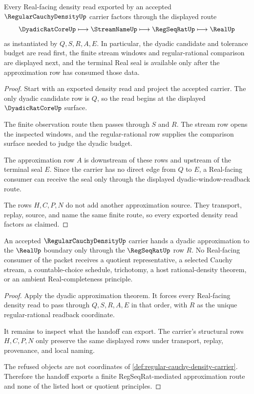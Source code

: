 \begin{theorem}
\label{thm:regular-cauchy-density-dyadic-approximation}
Every Real-facing density read exported by an accepted
$\RegularCauchyDensityUp$ carrier factors through the displayed route
$$
\DyadicRatCoreUp \longmapsto \StreamNameUp \longmapsto \RegSeqRatUp
\longmapsto \RealUp
$$
as instantiated by $Q,S,R,A,E$. In particular, the dyadic candidate and
tolerance budget are read first, the finite stream windows and
regular-rational comparison are displayed next, and the terminal Real seal is
available only after the approximation row has consumed those data.
\end{theorem}
\begin{proof}
Start with an exported density read and project the accepted carrier. The
only dyadic candidate row is $Q$, so the read begins at the displayed
$\DyadicRatCoreUp$ surface.

The finite observation route then passes through $S$ and $R$. The stream row
opens the inspected windows, and the regular-rational row supplies the
comparison surface needed to judge the dyadic budget.

The approximation row $A$ is downstream of these rows and upstream of the
terminal seal $E$. Since the carrier has no direct edge from $Q$ to $E$, a
Real-facing consumer can receive the seal only through the displayed
dyadic-window-readback route.

The rows $H,C,P,N$ do not add another approximation source. They transport,
replay, source, and name the same finite route, so every exported density read
factors as claimed.
\end{proof}

\begin{theorem}
\label{thm:regular-cauchy-density-regseqrat-handoff}
An accepted $\RegularCauchyDensityUp$ carrier hands a dyadic approximation to
the $\RealUp$ boundary only through the $\RegSeqRatUp$ row $R$. No Real-facing
consumer of the packet receives a quotient representative, a selected Cauchy
stream, a countable-choice schedule, trichotomy, a host rational-density
theorem, or an ambient Real-completeness principle.
\end{theorem}
\begin{proof}
Apply the dyadic approximation theorem. It forces every Real-facing density
read to pass through $Q,S,R,A,E$ in that order, with $R$ as the unique
regular-rational readback coordinate.

It remains to inspect what the handoff can export. The carrier's structural
rows $H,C,P,N$ only preserve the same displayed rows under transport, replay,
provenance, and local naming.

The refused objects are not coordinates of
\autoref{def:regular-cauchy-density-carrier}. Therefore the handoff exports a
finite RegSeqRat-mediated approximation route and none of the listed host or
quotient principles.
\end{proof}

